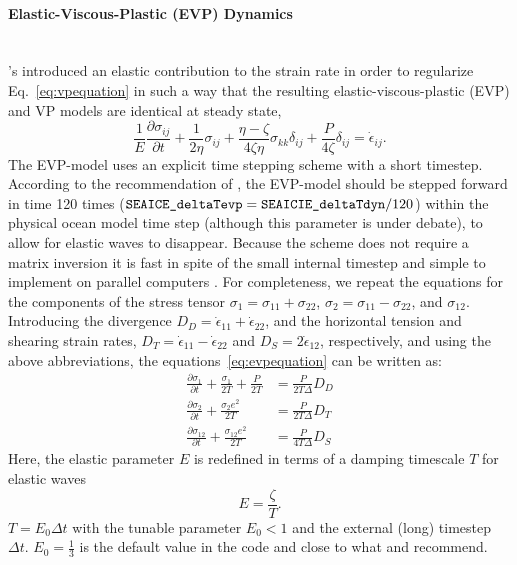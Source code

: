 \paragraph{Elastic-Viscous-Plastic (EVP) Dynamics\label{sec:pkg:seaice:EVPdynamics}}~\\
%
\citet{hun97}'s introduced an elastic contribution to the strain
rate in order to regularize Eq.~\ref{eq:vpequation} in such a way that
the resulting elastic-viscous-plastic (EVP) and VP models are
identical at steady state,
\begin{equation}
  \label{eq:evpequation}
  \frac{1}{E}\frac{\partial\sigma_{ij}}{\partial{t}} +
  \frac{1}{2\eta}\sigma_{ij} 
  + \frac{\eta - \zeta}{4\zeta\eta}\sigma_{kk}\delta_{ij}  
  + \frac{P}{4\zeta}\delta_{ij}
  = \dot{\epsilon}_{ij}. 
\end{equation}
The EVP-model uses an explicit time stepping scheme with a short
timestep. According to the recommendation of \citet{hun97}, the
EVP-model should be stepped forward in time 120 times
($\texttt{SEAICE\_deltaTevp} = \texttt{SEAICIE\_deltaTdyn}/120$) within
the physical ocean model time step (although this parameter is under
debate), to allow for elastic waves to disappear.  Because the scheme
does not require a matrix inversion it is fast in spite of the small
internal timestep and simple to implement on parallel computers
\citep{hun97}. For completeness, we repeat the equations for the
components of the stress tensor $\sigma_{1} =
\sigma_{11}+\sigma_{22}$, $\sigma_{2}= \sigma_{11}-\sigma_{22}$, and
$\sigma_{12}$. Introducing the divergence $D_D =
\dot{\epsilon}_{11}+\dot{\epsilon}_{22}$, and the horizontal tension
and shearing strain rates, $D_T =
\dot{\epsilon}_{11}-\dot{\epsilon}_{22}$ and $D_S =
2\dot{\epsilon}_{12}$, respectively, and using the above
abbreviations, the equations~\ref{eq:evpequation} can be written as:
\begin{align}
  \label{eq:evpstresstensor1}
  \frac{\partial\sigma_{1}}{\partial{t}} + \frac{\sigma_{1}}{2T} +
  \frac{P}{2T} &= \frac{P}{2T\Delta} D_D \\
  \label{eq:evpstresstensor2}
  \frac{\partial\sigma_{2}}{\partial{t}} + \frac{\sigma_{2} e^{2}}{2T}
  &= \frac{P}{2T\Delta} D_T \\
  \label{eq:evpstresstensor12}
  \frac{\partial\sigma_{12}}{\partial{t}} + \frac{\sigma_{12} e^{2}}{2T}
  &= \frac{P}{4T\Delta} D_S 
\end{align}
Here, the elastic parameter $E$ is redefined in terms of a damping
timescale $T$ for elastic waves \[E=\frac{\zeta}{T}.\]
$T=E_{0}\Delta{t}$ with the tunable parameter $E_0<1$ and the external
(long) timestep $\Delta{t}$.  $E_{0} = \frac{1}{3}$ is the default
value in the code and close to what \citet{hun97} and
\citet{hun01} recommend.

